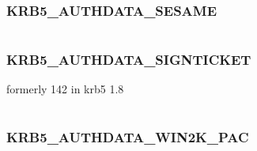 \documentclass[letterpaper,10pt,english]{sphinxmanual}
\begin{document}
\subsubsection{KRB5\_AUTHDATA\_SESAME}
\label{appdev/refs/macros/KRB5_AUTHDATA_SESAME:krb5-authdata-sesame}\label{appdev/refs/macros/KRB5_AUTHDATA_SESAME::doc}\label{appdev/refs/macros/KRB5_AUTHDATA_SESAME:krb5-authdata-sesame-data}

\begin{fulllineitems}
\label{appdev/refs/macros/KRB5_AUTHDATA_SESAME:KRB5_AUTHDATA_SESAME}
\end{fulllineitems}


\begin{tabulary}{\linewidth}{|L|L|}
\hline

 & 
\\
\hline\end{tabulary}



\subsubsection{KRB5\_AUTHDATA\_SIGNTICKET}
\label{appdev/refs/macros/KRB5_AUTHDATA_SIGNTICKET:krb5-authdata-signticket-data}\label{appdev/refs/macros/KRB5_AUTHDATA_SIGNTICKET:krb5-authdata-signticket}\label{appdev/refs/macros/KRB5_AUTHDATA_SIGNTICKET::doc}

\begin{fulllineitems}
\label{appdev/refs/macros/KRB5_AUTHDATA_SIGNTICKET:KRB5_AUTHDATA_SIGNTICKET}
\end{fulllineitems}


formerly 142 in krb5 1.8

\begin{tabulary}{\linewidth}{|L|L|}
\hline

 & 
\\
\hline\end{tabulary}



\subsubsection{KRB5\_AUTHDATA\_WIN2K\_PAC}
\label{appdev/refs/macros/KRB5_AUTHDATA_WIN2K_PAC:krb5-authdata-win2k-pac-data}\label{appdev/refs/macros/KRB5_AUTHDATA_WIN2K_PAC::doc}\label{appdev/refs/macros/KRB5_AUTHDATA_WIN2K_PAC:krb5-authdata-win2k-pac}
\end{document}
